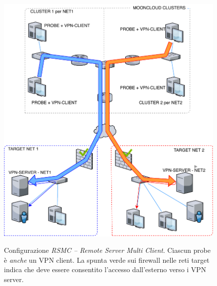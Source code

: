 \begin{figure}[h!]
	\includegraphics[scale=0.55]{img/rsmc}
	\label{fig:rsmc}
	\caption[Configurazione \textit{RSMC -- Remote Server Multi Client}]{Configurazione
		\textit{RSMC -- Remote Server Multi Client}. Ciascun probe è \textit{anche} un VPN client.
		La spunta verde sui firewall nelle reti target indica che deve essere consentito l'accesso
	dall'esterno verso i VPN server.}
\end{figure}


